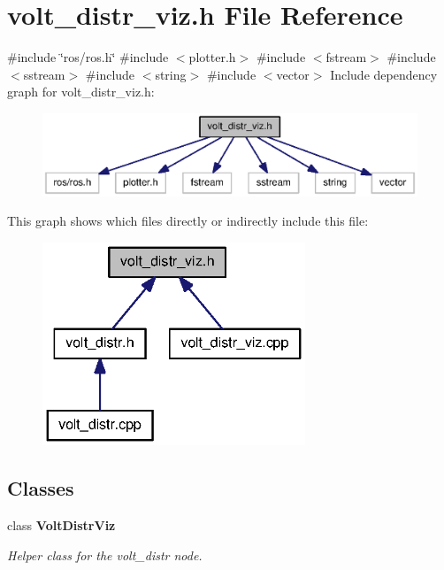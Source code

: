 \section{volt\-\_\-distr\-\_\-viz.\-h \-File \-Reference}
\label{volt__distr__viz_8h}
{\ttfamily \#include \char`\"{}ros/ros.\-h\char`\"{}}\*
{\ttfamily \#include $<$plotter.\-h$>$}\*
{\ttfamily \#include $<$fstream$>$}\*
{\ttfamily \#include $<$sstream$>$}\*
{\ttfamily \#include $<$string$>$}\*
{\ttfamily \#include $<$vector$>$}\*
\-Include dependency graph for volt\-\_\-distr\-\_\-viz.\-h\-:
\nopagebreak
\begin{figure}[H]
\begin{center}
\leavevmode
\includegraphics[width=350pt]{volt__distr__viz_8h__incl}
\end{center}
\end{figure}
\-This graph shows which files directly or indirectly include this file\-:
\nopagebreak
\begin{figure}[H]
\begin{center}
\leavevmode
\includegraphics[width=223pt]{volt__distr__viz_8h__dep__incl}
\end{center}
\end{figure}
\subsection*{\-Classes}
\begin{DoxyCompactItemize}
\item 
class {\bf \-Volt\-Distr\-Viz}
\begin{DoxyCompactList}\small\item\em \-Helper class for the volt\-\_\-distr node. \end{DoxyCompactList}\end{DoxyCompactItemize}
